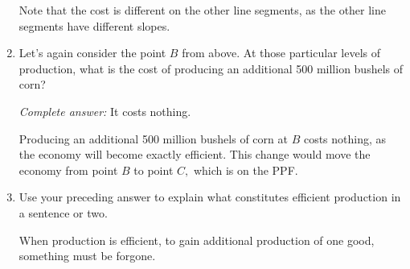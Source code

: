 \documentclass{assignment}
\begin{document}
\begin{enumerate}
\begin{solution}
Note that the cost is different on the other line segments, as the other line segments have different slopes.
\end{solution}

\clearpage

\item Let's again consider the point $B$ from above. At those particular levels of production, what is the cost of producing an additional 500 million bushels of corn?

\begin{solution}
\emph{Complete answer:} It costs nothing.

Producing an additional 500 million bushels of corn at $B$ costs nothing, as the economy will become exactly efficient. This change would move the economy from point $B$ to point $C,$ which is on the PPF.
\end{solution}

\item Use your preceding answer to explain what constitutes efficient production in a sentence or two.

\begin{solution}
When production is efficient, to gain additional production of one good, something must be forgone.
\end{solution}

\end{enumerate}
\end{document}
